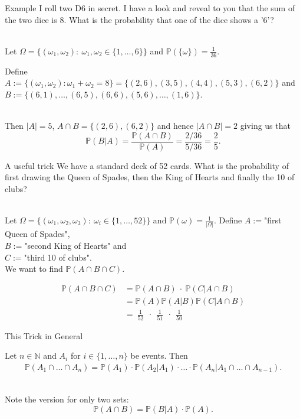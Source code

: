 \documentclass[11pt,pdf,ngerman,UKenglish]{beamer}%
\newcommand{\IN}{\mathds{N}}
\newcommand{\IP}{\mathbb{P}}
\newcommand{\1}{\mathbb{1}}
\theoremstyle{thm}
\theoremstyle{def}
\begin{document}
\begin{frame}{Example}
I roll two D6 in secret. I have a look and reveal to you that the sum of the two dice is $8$. What is the probability that one of the dice shows a '$6$'?

\ \\
\pause
Let $\Omega = \{ (\omega_1,\omega_2):\ \omega_1,\omega_2 \in \{1, \ldots, 6 \}\}$ and $\IP(\{\omega\}) = \frac{1}{36}$.

Define $A:=\{ (\omega_1,\omega_2): \omega_1+ \omega_2 = 8 \} = \{ (2,6),(3,5), (4,4), (5,3), (6,2)\}$ and \\$B:=\{ (6,1),\ldots,(6,5),(6,6),(5,6),\ldots,(1,6) \}$.

\ \\
\pause
Then $\vert A \vert =5$, $A \cap B= \{ (2,6),(6,2)\}$ and hence $\vert A \cap B \vert = 2$ giving us that
$$ \IP(B \vert A) = \frac{\IP(A \cap B)}{\IP(A)} = \frac{ 2/36}{5/36} = \frac25
.$$
\end{frame}


\begin{frame}{A useful trick}
We have a standard deck of 52 cards. What is the probability of first drawing the Queen of Spades, then the King of Hearts and finally the 10 of clubs?

\ \\
Let $\Omega = \{ (\omega_1,\omega_2,\omega_3):\ \omega_i \in \{1,\ldots,52\}\}$ and $\IP(\omega)=\frac{1}{\vert \Omega \vert}$. Define
$A:=$"first Queen of Spades", \\ 
$B:=$"second King of Hearts" and \\ 
$C:=$"third 10 of clubs". \\
We want to find $\IP(A \cap B \cap C)$. 

\pause
\begin{align*}
\IP(A \cap B \cap C) 
&= \IP(A \cap B) \ \cdot \ \IP( C \vert A \cap B)
\\&
= \IP(A) \IP(A \vert B) \IP( C \vert A \cap B)
\\ &
= \ \frac{1}{52} \ \ \cdot \ \ \frac{1}{51} \ \ \cdot \ \ \frac{1}{50}
\end{align*}
\end{frame}


\begin{frame}{This Trick in General}
\begin{corollary}
Let $n \in \IN$ and $A_i$ for $i \in \{ 1, \ldots, n \}$ be events. Then
\begin{align*}
\IP\left( A_1 \cap \ldots \cap A_n \right) 
= \IP( A_1) \cdot \IP(A_2 \vert A_1 ) \cdot \ldots \cdot \IP( A_n \vert A_1 \cap \ldots \cap A_{n-1} )
.
\end{align*}
\end{corollary}

\ \\
Note the version for only two sets:
$$ \IP(A \cap B) = \IP(B \vert A) \cdot \IP(A)
.$$
\end{frame}
\end{document}
